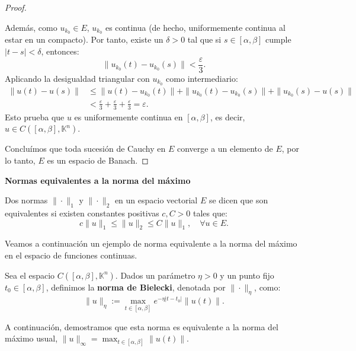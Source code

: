 \begin{proof}
\begin{enumerate}
        Además, como $u_{k_0} \in E$, $u_{k_0}$ es continua (de hecho, uniformemente continua al estar en un compacto). Por tanto, existe un $\delta > 0$ tal que si $s \in [\alpha, \beta]$ cumple $|t - s| < \delta$, entonces:
        \[
            \| u_{k_0}(t) - u_{k_0}(s) \| < \frac{\varepsilon}{3}.
        \]
        Aplicando la desigualdad triangular con $u_{k_0}$ como intermediario:
        \[
        \begin{aligned}
            \| u(t) - u(s) \| &\leq \| u(t) - u_{k_0}(t) \| + \| u_{k_0}(t) - u_{k_0}(s) \| + \| u_{k_0}(s) - u(s) \| \\
            &< \frac{\varepsilon}{3} + \frac{\varepsilon}{3} + \frac{\varepsilon}{3} = \varepsilon.
        \end{aligned}
        \]
        Esto prueba que $u$ es uniformemente continua en $[\alpha, \beta]$, es decir, $u \in C([\alpha, \beta], \mathbb{K}^n)$.        
    \end{enumerate}

    Concluímos que toda sucesión de Cauchy en $E$ converge a un elemento de $E$, por lo tanto, $E$ es un espacio de Banach.

\end{proof}


\textbf{Normas equivalentes a la norma del máximo}\\

\begin{definición} 
    Dos normas $\| \cdot \|_1$ y $\| \cdot \|_2$ en un espacio vectorial $E$ se dicen que son equivalentes si existen constantes positivas $c, C > 0$ tales que:
    \[
        c \| u \|_1 \leq \| u \|_2 \leq C \| u \|_1, \quad \forall u \in E.
    \]    
\end{definición}

Veamos a continuación un ejemplo de norma equivalente a la norma del máximo en el espacio de funciones continuas.

\begin{definición} 
    Sea el espacio $C([\alpha, \beta], \mathbb{K}^n)$. Dados un parámetro $\eta > 0$ y un punto fijo $t_0 \in [\alpha, \beta]$, definimos la \textbf{norma de Bielecki}, denotada por $\| \cdot \|_{\eta}$, como:
    \[
        \| u \|_{\eta} := \max_{t \in [\alpha, \beta]} e^{-\eta |t-t_0|} \| u(t) \|.
    \]
\end{definición}

A continuación, demostramos que esta norma es equivalente a la norma del máximo usual, $\| u \|_{\infty} = \max_{t \in [\alpha, \beta]} \|u(t)\|$.

